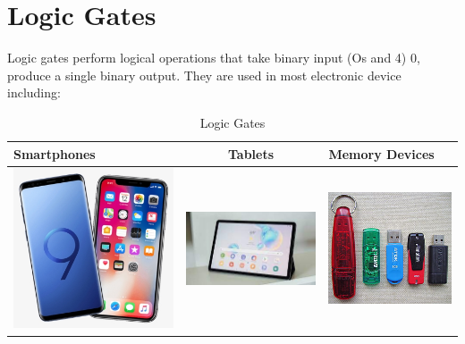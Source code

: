 \documentclass{article}
\begin{document}
 
	\section{Logic Gates} Logic gates perform logical operations that take binary input (Os and 4) 0, produce a single binary output. They are used in most electronic device including: 
	\begin{table}[h!] 
		\begin{center} 
			\caption{Logic Gates} \label{tab:tablel} 
			\begin{tabular}{l|c|l} 
			\hline 
			Smartphones & Tablets & Memory Devices\\ 
			\hline 
			\includegraphics[width=0.2\linewidth]{smartphone}
			& 
			\includegraphics[width=0.25\linewidth]{tablet}
			&
			\includegraphics[width=0.2\linewidth]{flashdrive}\\ 
			\hline 
			\end{tabular}
 		\end{center} 
	\end{table} 
\end{document}
